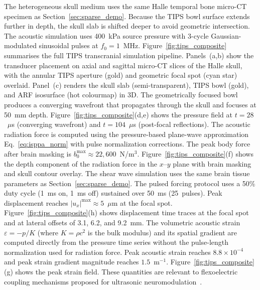 \documentclass{iopjournal}
\begin{document}
The heterogeneous skull medium uses the same Halle temporal bone micro-CT
specimen as Section~\ref{sec:sparse_demo}. Because the TIPS bowl surface
extends further in depth, the skull slab is shifted deeper to avoid geometric
intersection. The acoustic simulation uses 400~kPa source pressure with
3-cycle Gaussian-modulated sinusoidal pulses at $f_0 = 1$~MHz.
Figure~\ref{fig:tips_composite} summarises the full TIPS transcranial
simulation pipeline.
Panels~(a,b) show the transducer placement on axial and sagittal micro-CT
slices of the Halle skull, with the annular TIPS aperture (gold) and
geometric focal spot (cyan star) overlaid.
Panel~(c) renders the skull slab (semi-transparent), TIPS bowl (gold), and
ARF isosurface (hot colourmap) in 3D.
The geometrically focused bowl produces a converging wavefront that propagates
through the skull and focuses at 50~mm depth.
Figure~\ref{fig:tips_composite}(d,e) shows the pressure field at $t = 28$~$\mu$s
(converging wavefront) and $t = 104$~$\mu$s (post-focal reflections).
The acoustic radiation force is computed using the pressure-based plane-wave
approximation Eq.~\eqref{eq:isppa_norm} with pulse normalization corrections.
The peak body force after brain masking is
$b_0^{\max} \approx 22{,}600$~N/m$^3$.
Figure~\ref{fig:tips_composite}(f) shows the depth component of the radiation
force in the $x$--$y$ plane with brain masking and skull contour overlay.
The shear wave simulation uses the same brain tissue parameters as
Section~\ref{sec:sparse_demo}. The pulsed forcing protocol uses a 50\% duty
cycle (1~ms on, 1~ms off) sustained over 50~ms (25~pulses). Peak displacement
reaches $|u_x|^{\max} \approx 5$~$\mu$m at the focal spot.
Figure~\ref{fig:tips_composite}(h) shows displacement time traces at the
focal spot and at lateral offsets of 3.1, 6.2, and 9.2~mm.
The volumetric acoustic strain $\varepsilon = -p/K$ (where $K = \rho c^2$ is
the bulk modulus) and its spatial gradient are computed directly from the
pressure time series without the pulse-length normalization used for radiation
force. Peak acoustic strain reaches $8.8 \times 10^{-4}$ and peak strain
gradient magnitude reaches $1.5$~m$^{-1}$.
Figure~\ref{fig:tips_composite}(g) shows the peak strain field. These
quantities are relevant to flexoelectric coupling mechanisms proposed for
ultrasonic neuromodulation~\cite{felix2022flexo}.
\end{document}
